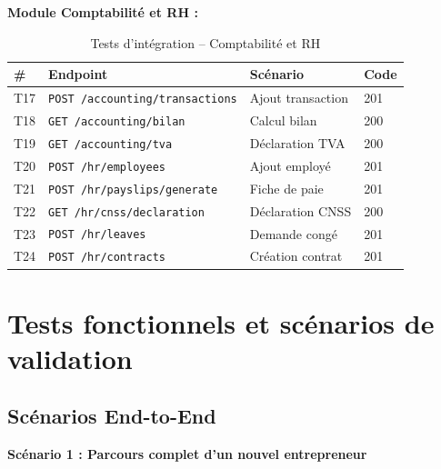 \textbf{Module Comptabilité et RH :}

\begin{table}[H]
\centering
\caption{Tests d'intégration -- Comptabilité et RH}
\label{tab:integration-compta}
\begin{tabular}{|l|l|l|l|}
\hline
\textbf{\#} & \textbf{Endpoint} & \textbf{Scénario} & \textbf{Code} \\
\hline
T17 & \texttt{POST /accounting/transactions} & Ajout transaction & 201 \\
\hline
T18 & \texttt{GET /accounting/bilan} & Calcul bilan & 200 \\
\hline
T19 & \texttt{GET /accounting/tva} & Déclaration TVA & 200 \\
\hline
T20 & \texttt{POST /hr/employees} & Ajout employé & 201 \\
\hline
T21 & \texttt{POST /hr/payslips/generate} & Fiche de paie & 201 \\
\hline
T22 & \texttt{GET /hr/cnss/declaration} & Déclaration CNSS & 200 \\
\hline
T23 & \texttt{POST /hr/leaves} & Demande congé & 201 \\
\hline
T24 & \texttt{POST /hr/contracts} & Création contrat & 201 \\
\hline
\end{tabular}
\end{table}

\section{Tests fonctionnels et scénarios de validation}

\subsection{Scénarios End-to-End}

\textbf{Scénario 1 : Parcours complet d'un nouvel entrepreneur}

